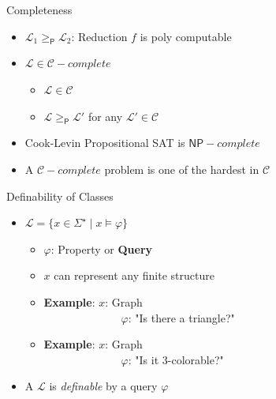 \documentclass[usenames,dvipsnames]{beamer}
\newcommand{\cC}{\mathcal{C}}
\newcommand{\cL}{\mathcal{L}}
\newcommand{\PTime}{\mathsf{P}}
\newcommand{\NP}{\mathsf{NP}}
\begin{document}
\begin{frame}{Completeness}
    \begin{itemize}
        \item $\cL_1\geq_{\PTime}\cL_2$: Reduction $f$ is poly computable
        \item $\cL\in\cC-complete$
        \begin{itemize}
            \item $\cL\in\cC$
            \item $\cL\geq_\PTime\cL'$ for any $\cL'\in\cC$
        \end{itemize}
        \item[] 
        \begin{block}{Cook-Levin}
        Propositional SAT is $\NP-complete$    
        \end{block}

        \item A $\cC-complete$ problem is one of the hardest in $\cC$
    \end{itemize}
\end{frame}

\begin{frame}{Definability of Classes}
    \begin{itemize}
        \item $\cL = \{x\in\Sigma^\star\mid x\vDash\varphi\}$
        \begin{itemize}
            \item $\varphi$: Property or \textbf{Query}
            \item $x$ can represent any finite structure
            \item \textbf{Example}: $x$: Graph\\
            ~~~~~~~~~~~~~~$\varphi$: "Is there a triangle?"
            \item \textbf{Example}: $x$: Graph\\
            ~~~~~~~~~~~~~~$\varphi$: "Is it $3$-colorable?"
        \end{itemize}
        \item A $\cL$ is \emph{definable} by a query $\varphi$
    \end{itemize}
\end{frame}
\end{document}
